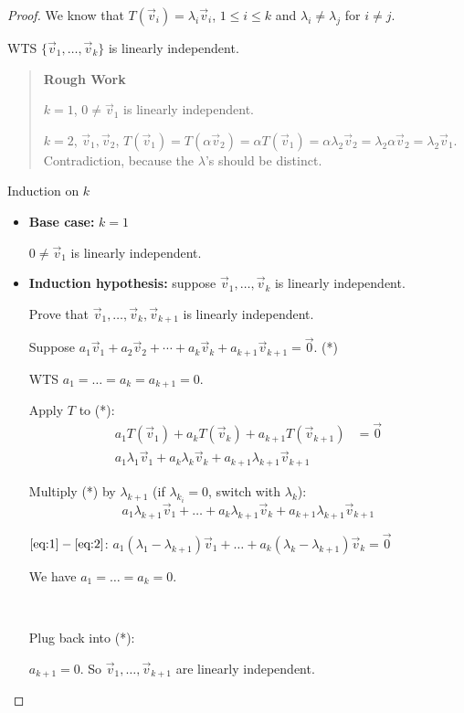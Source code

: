 \documentclass[11pt,fleqn]{book} %
\begin{document}
\begin{proof}
    We know that $T(\vec{v}_i) = \lambda_i\vec{v}_i$, $1 \le i \le k$ and $\lambda_i \neq \lambda_j$ for $i \neq j$. 

    WTS $\{ \vec{v}_1, \dots, \vec{v}_k \}$ is linearly independent. 

\begin{quote}
    \textbf{Rough Work}
    
    $k = 1$, $0 \neq \vec{v}_1$ is linearly independent.
    
    $k = 2$, $\vec{v}_1, \vec{v}_2$, $T(\vec{v}_1) = T(\alpha\vec{v}_2) = \alpha T(\vec{v}_1) = \alpha\lambda_2 \vec{v}_2 = \lambda_2\alpha\vec{v}_2 = \lambda_2\vec{v}_1$. Contradiction, because the $\lambda$'s should be distinct. 
\end{quote}

    Induction on $k$
    
    \begin{itemize}
        \item \textbf{Base case:} $k = 1$

        $0 \neq \vec{v}_1$ is linearly independent.
        
        \item \textbf{Induction hypothesis:} suppose $\vec{v}_1, \dots, \vec{v}_k$ is linearly independent. 
    
        Prove that $\vec{v}_1, \dots, \vec{v}_k, \vec{v}_{k+1}$ is linearly independent. 

    Suppose $a_1\vec{v}_1 + a_2\vec{v}_2 + \cdots + a_k\vec{v}_k + a_{k+1}\vec{v}_{k+1} = \vec{0}$. (*)

    WTS $a_1 = \dots = a_k = a_{k+1} = 0$. 

    Apply $T$ to (*): 
    \begin{align*}
        a_1T(\vec{v}_1) + a_kT(\vec{v}_k) +a_{k+1}T(\vec{v}_{k+1}) 
        &= \vec{0}
        \\
        a_1\lambda_1\vec{v}_1 +a_k\lambda_k\vec{v}_k +a_{k+1}\lambda_{k+1}\vec{v}_{k+1} 
        \label{eq:1}\tag{1}
    \end{align*}

    Multiply (*) by $\lambda_{k+1}$ (if $\lambda_{k_i} = 0$, switch with $\lambda_k$): 
    \begin{equation*}
        a_1\lambda_{k+1}\vec{v}_1 + \dots + a_k\lambda_{k+1}\vec{v}_k + a_{k+1}\lambda_{k+1}\vec{v}_{k+1}
        \label{eq:2}\tag{2}
    \end{equation*}

    $\ref{eq:1} - \ref{eq:2}$: 
    $a_1(\lambda_1 - \lambda_{k+1})\vec{v}_1 + \dots + a_k(\lambda_k-\lambda_{k+1})\vec{v}_k = \vec{0}$

    We have $a_1 = \dots = a_k = 0$. 
    
    {~~~}

    Plug back into (*): 

    $a_{k+1} = 0$. So $\vec{v}_1, \dots, \vec{v}_{k+1}$ are linearly independent. 
    \end{itemize}
\end{proof}
\end{document}
